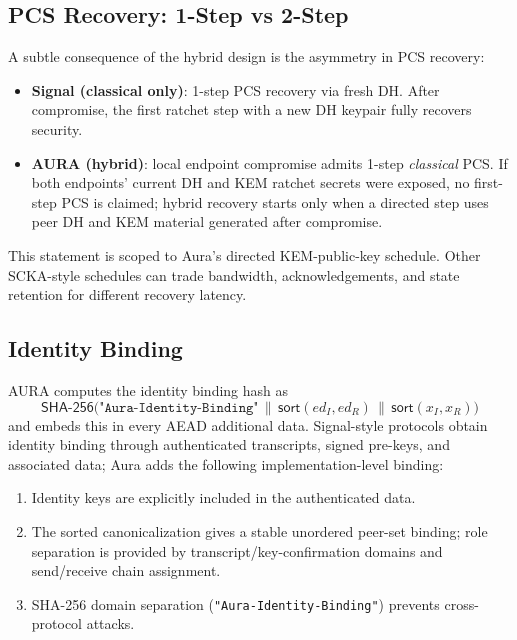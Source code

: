 \documentclass[11pt,a4paper]{article}
\theoremstyle{definition}
\theoremstyle{remark}
\newcommand{\SHA}{\mathsf{SHA\text{-}256}}
\newcommand{\concat}{\,\|\,}
\begin{document}
\subsection{PCS Recovery: 1-Step vs 2-Step}

A subtle consequence of the hybrid design is the asymmetry in PCS recovery:

\begin{itemize}[nosep]
  \item \textbf{Signal (classical only)}: 1-step PCS recovery via fresh DH.
        After compromise, the first ratchet step with a new DH keypair fully
        recovers security.
  \item \textbf{AURA (hybrid)}: local endpoint compromise admits 1-step
        \emph{classical} PCS. If both endpoints' current DH and KEM ratchet
        secrets were exposed, no first-step PCS is claimed; hybrid recovery
        starts only when a directed step uses peer DH and KEM material generated
        after compromise.
\end{itemize}

This statement is scoped to Aura's directed KEM-public-key schedule. Other
SCKA-style schedules can trade bandwidth, acknowledgements, and state retention
for different recovery latency.

\subsection{Identity Binding}

AURA computes the identity binding hash as
\[
  \SHA\bigl(\texttt{"Aura-Identity-Binding"} \concat
  \mathsf{sort}(\mathit{ed}_{I}, \mathit{ed}_{R}) \concat
  \mathsf{sort}(\mathit{x}_{I}, \mathit{x}_{R})\bigr)
\]
and embeds this in every AEAD additional data. Signal-style protocols obtain
identity binding through authenticated transcripts, signed pre-keys, and
associated data; Aura adds the following implementation-level binding:
\begin{enumerate}[nosep]
  \item Identity keys are explicitly included in the authenticated data.
  \item The sorted canonicalization gives a stable unordered peer-set binding;
        role separation is provided by transcript/key-confirmation domains and
        send/receive chain assignment.
  \item SHA-256 domain separation (\texttt{"Aura-Identity-Binding"})
        prevents cross-protocol attacks.
\end{enumerate}
\end{document}
